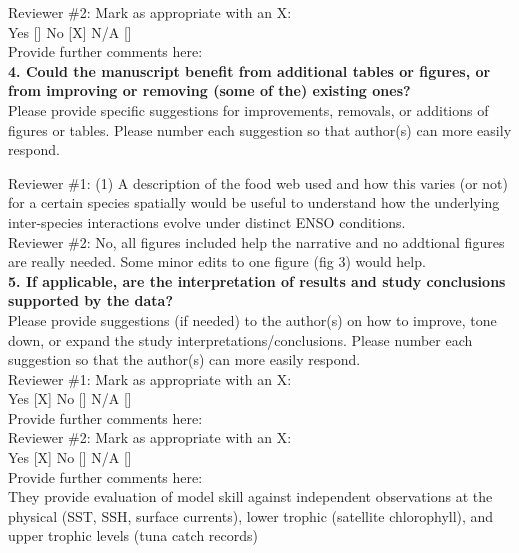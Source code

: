 \documentclass[12pt]{article}
\begin{document}
Reviewer \#2: Mark as appropriate with an X:\\
Yes [] No [X] N/A []\\
Provide further comments here:\\

\textbf{4. Could the manuscript benefit from additional tables or figures, or from improving or removing (some of the) existing ones?} \\

Please provide specific suggestions for improvements, removals, or additions of figures or tables. Please number each suggestion so that author(s) can more easily respond.

Reviewer \#1: (1) A description of the food web used and how this varies (or not) for a certain species spatially would be useful to understand how the underlying inter-species interactions evolve under distinct ENSO conditions.\\


Reviewer \#2: No, all figures included help the narrative and no addtional figures are really needed. Some minor edits to one figure (fig 3) would help.\\

\textbf{5. If applicable, are the interpretation of results and study conclusions supported by the data?}\\

Please provide suggestions (if needed) to the author(s) on how to improve, tone down, or expand the study interpretations/conclusions. Please number each suggestion so that the author(s) can more easily respond.\\

Reviewer \#1: Mark as appropriate with an X:\\
Yes [X] No [] N/A []\\
Provide further comments here:\\

Reviewer \#2: Mark as appropriate with an X:\\
Yes [X] No [] N/A []\\

Provide further comments here:\\ 

They provide evaluation of model skill against independent observations at the physical (SST, SSH, surface currents), lower trophic (satellite chlorophyll), and upper trophic levels (tuna catch records) \\
\end{document}

